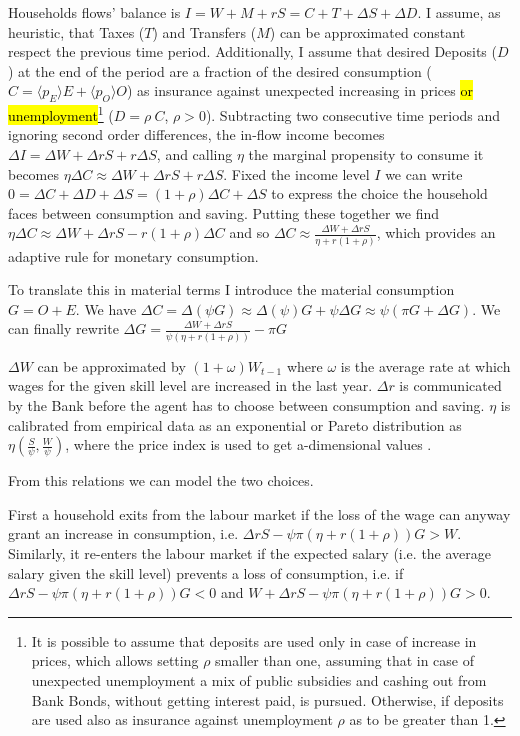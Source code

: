 \documentclass[a4paper, headings=standardclasses]{scrartcl}
\begin{document}
Households flows' balance is $I = W + M + rS = C + T + \Delta S + \Delta D$.
I assume, as heuristic, that Taxes ($T$) and Transfers ($M$) can be approximated constant respect the previous time period.
Additionally, I assume that desired Deposits ($D$) at the end of the period are a fraction of the desired consumption ($C = \langle p_E \rangle E + \langle p_O \rangle O$) as insurance against unexpected increasing in prices \hl{or unemployment}\footnote{It is possible to assume that deposits are used only in case of increase in prices, which allows setting $\rho$ smaller than one, assuming that in case of unexpected unemployment a mix of public subsidies and cashing out from Bank Bonds, without getting interest paid, is pursued. Otherwise, if deposits are used also as insurance against unemployment $\rho$ as to be greater than 1.} ($D = \rho~C$, $\rho > 0$).
Subtracting two consecutive time periods and ignoring second order differences, the in-flow income becomes $\Delta I = \Delta W + \Delta r S + r \Delta S$, and calling $\eta$ the marginal propensity to consume it becomes $\eta \Delta C \approx \Delta W + \Delta r S + r \Delta S$.
Fixed the income level $I$ we can write $0 = \Delta C + \Delta D + \Delta S = (1+\rho) \Delta C + \Delta S$ to express the choice the household faces between consumption and saving.
Putting these together we find $\eta \Delta C \approx \Delta W + \Delta r S - r (1+\rho) \Delta C$ and so $\Delta C \approx \frac{\Delta W + \Delta r S}{\eta + r (1+\rho)}$, which provides an adaptive rule for monetary consumption.

To translate this in material terms I introduce the material consumption $G = O + E$. We have $\Delta C = \Delta (\psi G) \approx \Delta(\psi) G + \psi \Delta G \approx \psi (\pi G + \Delta G)$. We can finally rewrite $\Delta G = \frac{\Delta W + \Delta r S}{\psi (\eta + r (1+\rho))} - \pi G$

$\Delta W$ can be approximated by $(1 + \omega) W_{t-1}$ where $\omega$ is the average rate at which wages for the given skill level are increased in the last year. $\Delta r$ is communicated by the Bank before the agent has to choose between consumption and saving. $\eta$ is calibrated from empirical data as an exponential or Pareto distribution as $\eta(\frac{S}{\psi},\frac{W}{\psi})$, where the price index is used to get a-dimensional values \parencite{fisher2020,carroll2017}.

From this relations we can model the two choices.

First a household exits from the labour market if the loss of the wage can anyway grant an increase in consumption, i.e. $\Delta r S - \psi \pi (\eta + r (1+\rho)) G > W$. Similarly, it re-enters the labour market if the expected salary (i.e. the average salary given the skill level) prevents a loss of consumption, i.e. if $\Delta r S - \psi \pi (\eta + r (1+\rho)) G < 0$ and $W + \Delta r S - \psi \pi (\eta + r (1+\rho)) G > 0$.
\end{document}
